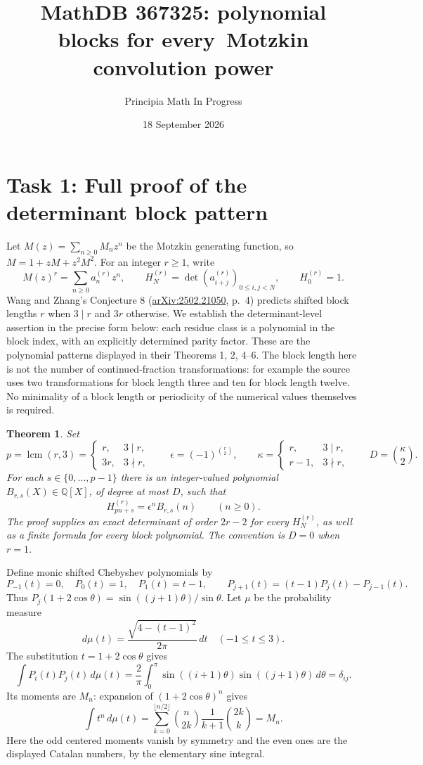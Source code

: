 \documentclass[10pt]{article}
\title{MathDB 367325: polynomial blocks for every\ Motzkin convolution power}
\author{Principia Math In Progress}
\date{18 September 2026}
\newtheorem{theorem}{Theorem}
\DeclareMathOperator{\lcm}{lcm}
\begin{document}
\maketitle

\section*{Task 1: Full proof of the determinant block pattern}
Let $M(z)=\sum_{n\ge0}M_nz^n$ be the Motzkin generating function,
so $M=1+zM+z^2M^2$. For an integer $r\ge1$, write
\[
 M(z)^r=\sum_{n\ge0}a_n^{(r)}z^n,\qquad
 H_N^{(r)}=\det(a_{i+j}^{(r)})_{0\le i,j<N},\qquad H_0^{(r)}=1.
\]
Wang and Zhang's Conjecture 8
(\href{https://arxiv.org/abs/2502.21050}{arXiv:2502.21050}, p.~4)
predicts shifted block lengths $r$ when $3\mid r$ and $3r$ otherwise.
We establish the determinant-level assertion in the precise form
below: each residue class is a polynomial in the block index, with
an explicitly determined parity factor. These are the polynomial
patterns displayed in their Theorems 1, 2, 4--6. The block length
here is not the number of continued-fraction transformations: for
example the source uses two transformations for block length three
and ten for block length twelve. No minimality of a block length
or periodicity of the numerical values themselves is required.

\begin{theorem}\label{main}
Set
\[
 p=\lcm(r,3)=\begin{cases}r,&3\mid r,\\3r,&3\nmid r,\end{cases}
 \qquad \epsilon=(-1)^{\binom r2},\qquad
 \kappa=\begin{cases}r,&3\mid r,\\r-1,&3\nmid r,\end{cases}
 \qquad D=\binom\kappa2.
\]
For each $s\in\{0,\ldots,p-1\}$ there is an integer-valued polynomial
$B_{r,s}(X)\in\mathbb Q[X]$, of degree at most $D$, such that
\begin{equation}\label{blocks}
 H_{pn+s}^{(r)}=\epsilon^n B_{r,s}(n)\qquad(n\ge0).
\end{equation}
The proof supplies an exact determinant of order $2r-2$ for every
$H_N^{(r)}$, as well as a finite formula for every block polynomial.
The convention is $D=0$ when $r=1$.
\end{theorem}

Define monic shifted Chebyshev polynomials by
\[
 P_{-1}(t)=0,\quad P_0(t)=1,\quad P_1(t)=t-1,\qquad
 P_{j+1}(t)=(t-1)P_j(t)-P_{j-1}(t).
\]
Thus $P_j(1+2\cos\theta)=\sin((j+1)\theta)/\sin\theta$.
Let $\mu$ be the probability measure
\[
 d\mu(t)=\frac{\sqrt{4-(t-1)^2}}{2\pi}\,dt\quad(-1\le t\le3).
\]
The substitution $t=1+2\cos\theta$ gives
\begin{equation}\label{orthogonal}
 \int P_i(t)P_j(t)\,d\mu(t)
 =\frac2\pi\int_0^\pi\sin((i+1)\theta)\sin((j+1)\theta)\,d\theta
 =\delta_{ij}.
\end{equation}
Its moments are $M_n$: expansion of $(1+2\cos\theta)^n$ gives
\[
 \int t^n\,d\mu(t)
 =\sum_{k=0}^{\lfloor n/2\rfloor}\binom n{2k}\frac1{k+1}\binom{2k}k=M_n.
\]
Here the odd centered moments vanish by symmetry and the even ones
are the displayed Catalan numbers, by the elementary sine integral.
\end{document}
